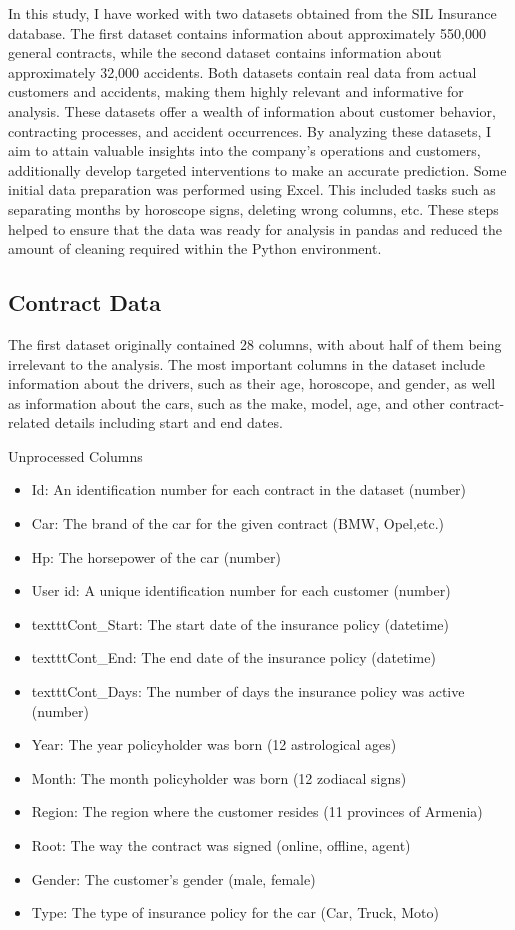 \documentclass{IEEEtran}
\begin{document}
In this study, I have worked with two datasets obtained from the SIL Insurance database. The first dataset contains information about approximately 550,000 general contracts, while the second dataset contains information about approximately 32,000 accidents. Both datasets contain real data from actual customers and accidents, making them highly relevant and informative for analysis. These datasets offer a wealth of information about customer behavior, contracting processes, and accident occurrences. By analyzing these datasets, I aim to attain valuable insights into the company's operations and customers, additionally develop targeted interventions to make an accurate prediction. Some initial data preparation was performed using Excel. This included tasks such as separating months by horoscope signs, deleting wrong columns, etc. These steps helped to ensure that the data was ready for analysis in pandas and reduced the amount of cleaning required within the Python environment.

\subsection{Contract Data}

The first dataset originally contained 28 columns, with about half of them being irrelevant to the analysis. The most important columns in the dataset include information about the drivers, such as their age, horoscope, and gender, as well as information about the cars, such as the make, model, age, and other contract-related details including start and end dates.

Unprocessed Columns
\begin{itemize}
\item Id: An identification number for each contract in the dataset (number)
\item Car: The brand of the car for the given contract (BMW, Opel,etc.)
\item Hp: The horsepower of the car (number)
\item User id: A unique identification number for each customer (number)
\item texttt{Cont\_Start}: The start date of the insurance policy (datetime)
\item texttt{Cont\_End}: The end date of the insurance policy (datetime)
\item texttt{Cont\_Days}: The number of days the insurance policy was active (number)
\item Year: The year policyholder was born (12 astrological ages)
\item Month: The month policyholder was born (12 zodiacal signs)
\item Region: The region where the customer resides (11 provinces of Armenia)
\item Root: The way the contract was signed (online, offline, agent)
\item Gender: The customer's gender (male, female)
\item Type: The type of insurance policy for the car (Car, Truck, Moto)
\end{itemize}
\end{document}
